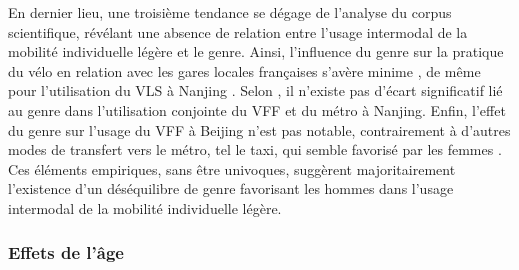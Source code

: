 \begin{refsegment}
En dernier lieu, une troisième tendance se dégage de l'analyse du corpus scientifique, révélant une absence de relation entre l'usage intermodal de la mobilité individuelle légère et le genre. Ainsi, l'influence du genre sur la pratique du vélo en relation avec les gares locales françaises s'avère minime \textcolor{blue}{\autocite[25]{hasiak_access_2019}}, de même pour l'utilisation du \acrshort{VLS} à Nanjing \textcolor{blue}{\autocite[128]{liu_understanding_2020}}. Selon \textcolor{blue}{\textcite[12]{liu_use_2020}}, il n'existe pas d'écart significatif lié au genre dans l'utilisation conjointe du \acrshort{VFF} et du métro à Nanjing. Enfin, l'effet du genre sur l'usage du \acrshort{VFF} à Beijing n'est pas notable, contrairement à d'autres modes de transfert vers le métro, tel le taxi, qui semble favorisé par les femmes \textcolor{blue}{\autocite[14]{ni_exploring_2020}}. Ces éléments empiriques, sans être univoques, suggèrent majoritairement l'existence d'un déséquilibre de genre favorisant les hommes dans l'usage intermodal de la mobilité individuelle légère.%

\subsubsection*{Effets de l'âge
    \label{chap2:age}
    }


\end{refsegment}
